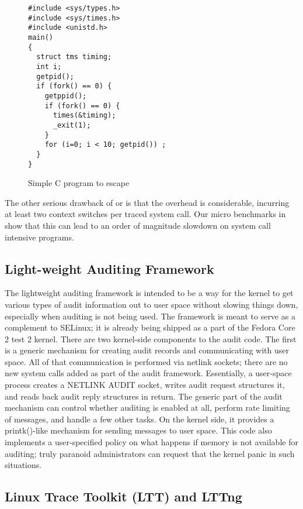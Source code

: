 \begin{figure}[htb]
\begin{verbatim}
#include <sys/types.h>
#include <sys/times.h>
#include <unistd.h>
main()
{
  struct tms timing;
  int i;
  getpid();
  if (fork() == 0) {
    getppid();
    if (fork() == 0) {
      times(&timing);
      _exit(1);
    }
    for (i=0; i < 10; getpid()) ;
  }
}
\end{verbatim}
\caption{Simple C program to escape }
\label{fig:ptrace-bug}
\end{figure}

The other serious drawback of  or  is that
the overhead is considerable, incurring at least two
context switches per traced system call.
Our micro benchmarks in  show that this can lead to an order of magnitude
slowdown on system call intensive programs.

\subsection{Light-weight Auditing Framework}

The lightweight auditing framework is intended to be a way for the kernel to
get various types of audit information out to user space without slowing things
down, especially when auditing is not being used. The framework is meant to
serve as a complement to SELinux; it is already being shipped as a part of the
Fedora Core 2 test 2 kernel. There are two kernel-side components to the audit
code. The first is a generic mechanism for creating audit records and
communicating with user space. All of that communication is performed via
netlink sockets; there are no new system calls added as part of the audit
framework. Essentially, a user-space process creates a NETLINK AUDIT socket,
writes audit request structures it, and reads back audit reply structures in
return. The generic part of the audit mechanism can control whether auditing is
enabled at all, perform rate limiting of messages, and handle a few other
tasks. On the kernel side, it provides a printk()-like mechanism for sending
messages to user space. This code also implements a user-specified policy on
what happens if memory is not available for auditing; truly paranoid
administrators can request that the kernel panic in such situations.

\subsection{Linux Trace Toolkit (LTT) and LTTng}
 
